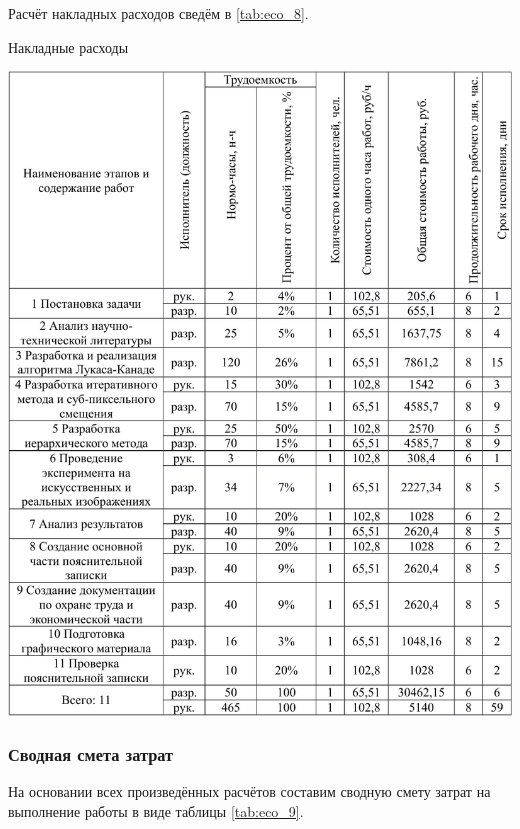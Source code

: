 Расчёт накладных расходов сведём в \ref{tab:eco_8}.

\begin{table}[!ht]
\caption{Накладные расходы}
\centering
\includegraphics[page=8, width=1\linewidth]{econom_table.pdf}
\label{tab:eco_8}
\end{table}

\subsubsection{Сводная смета затрат}

На основании всех произведённых расчётов составим сводную смету затрат на выполнение работы в виде таблицы \ref{tab:eco_9}.

